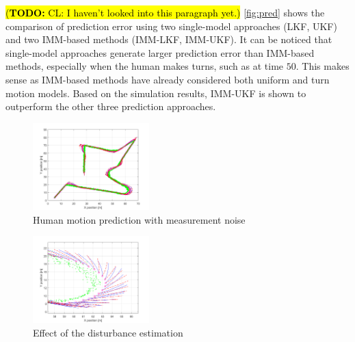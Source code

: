 \documentclass[journal]{IEEEtran}
\newcommand{\todohere}[1]{\hl{(\textbf{TODO:} #1)}}
\begin{document}
	\todohere{CL: I haven't looked into this paragraph yet.}
	\cref{fig:pred} shows the comparison of prediction error using two single-model approaches (LKF, UKF) and two IMM-based methods (IMM-LKF, IMM-UKF).
	It can be noticed that single-model approaches generate larger prediction error than IMM-based methods, especially when the human makes turns,  such as at time $50$.
	This makes sense as IMM-based methods have already considered both uniform and turn motion models.
	Based on the simulation results, IMM-UKF is shown to outperform the other three prediction approaches.
	\begin{figure}
		\centering
		\includegraphics[width=0.4\textwidth]{figures/prediction}
		\caption{Human motion prediction with measurement noise}
		\label{fig:prediction}
	\end{figure}        
	\begin{figure}
		\centering
		\includegraphics[width=0.4\textwidth]{figures/prediction_zoom1}
		\caption{Effect of the disturbance estimation}
		\label{fig:prediction_zoom1}
	\end{figure}	
\end{document}
